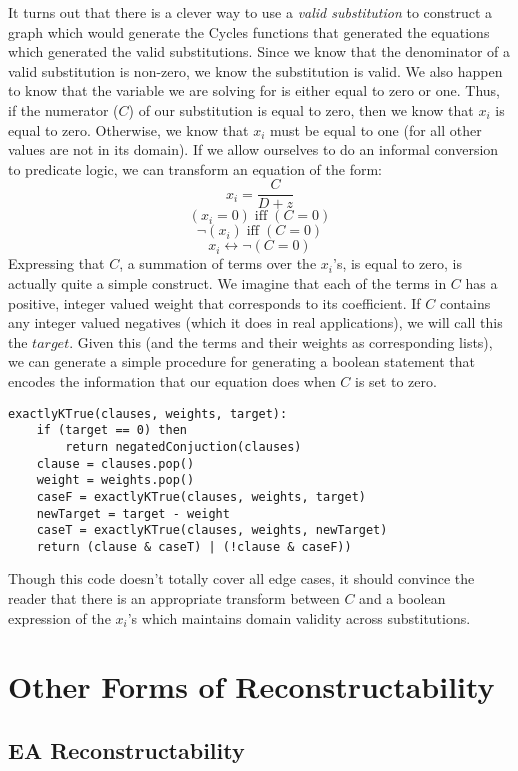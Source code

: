 It turns out that there is a clever way to use a \emph{valid substitution} to construct a graph which would generate the Cycles functions that generated the equations which generated the valid substitutions.
Since we know that the denominator of a valid substitution is non-zero, we know the substitution is valid.  
We also happen to know that the variable we are solving for is either equal to zero or one.  
Thus, if the numerator ($C$) of our substitution is equal to zero, then we know that $x_i$ is equal to zero.  
Otherwise, we know that $x_i$ must be equal to one (for all other values are not in its domain). 
If we allow ourselves to do an informal conversion to predicate logic, we can transform an equation of the form:
 $$x_i = \frac{C}{D + z}$$ 
 $$(x_i = 0) \; \text{iff} \; (C = 0)$$
 $$\neg(x_i) \; \text{iff} \; (C = 0)$$
 $$x_i  \leftrightarrow  \neg(C = 0)$$
Expressing that $C$, a summation of terms over the $x_i$'s, is equal to zero, is actually quite a simple construct. 
We imagine that each of the terms in $C$ has a positive, integer valued weight that corresponds to its coefficient. 
If $C$ contains any integer valued negatives (which it does in real applications), we will call this the $target$.
Given this (and the terms and their weights as corresponding lists), we can generate a simple procedure for generating a boolean statement that encodes the information that our equation does when $C$ is set to zero.

\begin{lstlisting}[frame=single]
exactlyKTrue(clauses, weights, target):
	if (target == 0) then
		return negatedConjuction(clauses)
	clause = clauses.pop()
	weight = weights.pop()
	caseF = exactlyKTrue(clauses, weights, target)
	newTarget = target - weight
	caseT = exactlyKTrue(clauses, weights, newTarget)
	return (clause & caseT) | (!clause & caseF))
\end{lstlisting}

Though this code doesn't totally cover all edge cases, it should convince the reader that there is an appropriate transform between $C$ and a boolean expression of the $x_i$'s which maintains domain validity across substitutions.

\section{Other Forms of Reconstructability}

\subsection{EA Reconstructability}

